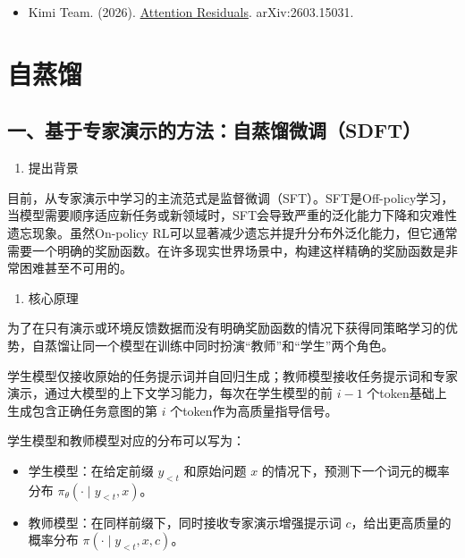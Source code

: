 \vspace{0.25em}
\begin{itemize}
\tightlist
\item
  Kimi Team. (2026). \href{https://arxiv.org/abs/2603.15031}{Attention Residuals}. arXiv:2603.15031.
\end{itemize}

\clearpage

\hypertarget{ux81eaux84b8ux998f}{%
\section{自蒸馏}\label{ux81eaux84b8ux998f}}

\hypertarget{ux4e00ux57faux4e8eux4e13ux5bb6ux6f14ux793aux7684ux65b9ux6cd5ux81eaux84b8ux998fux5faeux8c03sdft}{%
\subsection{一、基于专家演示的方法：自蒸馏微调（SDFT）}\label{ux4e00ux57faux4e8eux4e13ux5bb6ux6f14ux793aux7684ux65b9ux6cd5ux81eaux84b8ux998fux5faeux8c03sdft}}

\begin{enumerate}
\def\labelenumi{\arabic{enumi}.}
\tightlist
\item
  提出背景
\end{enumerate}

目前，从专家演示中学习的主流范式是监督微调（SFT）。SFT是Off-policy学习，当模型需要顺序适应新任务或新领域时，SFT会导致严重的泛化能力下降和灾难性遗忘现象。虽然On-policy RL可以显著减少遗忘并提升分布外泛化能力，但它通常需要一个明确的奖励函数。在许多现实世界场景中，构建这样精确的奖励函数是非常困难甚至不可用的。

\begin{enumerate}
\def\labelenumi{\arabic{enumi}.}
\setcounter{enumi}{1}
\tightlist
\item
  核心原理
\end{enumerate}

为了在只有演示或环境反馈数据而没有明确奖励函数的情况下获得同策略学习的优势，自蒸馏让同一个模型在训练中同时扮演``教师''和``学生''两个角色。

学生模型仅接收原始的任务提示词并自回归生成；教师模型接收任务提示词和专家演示，通过大模型的上下文学习能力，每次在学生模型的前 \(i-1\) 个token基础上生成包含正确任务意图的第 \(i\) 个token作为高质量指导信号。

学生模型和教师模型对应的分布可以写为：

\begin{itemize}
\tightlist
\item
  学生模型：在给定前缀 \(y_{<t}\) 和原始问题 \(x\) 的情况下，预测下一个词元的概率分布 \(\pi_\theta(\cdot \mid y_{<t}, x)\)。
\item
  教师模型：在同样前缀下，同时接收专家演示增强提示词 \(c\)，给出更高质量的概率分布 \(\pi(\cdot \mid y_{<t}, x, c)\)。
\end{itemize}


